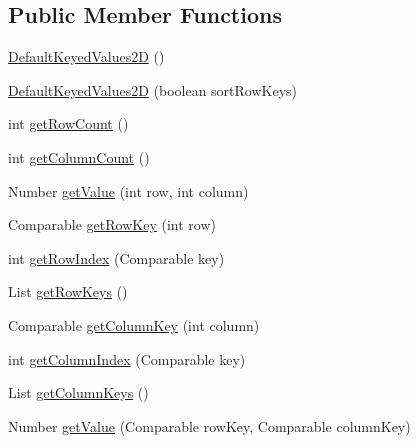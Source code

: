 \subsection*{Public Member Functions}
\begin{DoxyCompactItemize}
\item 
\mbox{\hyperlink{classorg_1_1jfree_1_1data_1_1_default_keyed_values2_d_ae59fdd8e8736823dd977172ee6c14449}{Default\+Keyed\+Values2D}} ()
\item 
\mbox{\hyperlink{classorg_1_1jfree_1_1data_1_1_default_keyed_values2_d_a13fb79f2ab8d086d9633fdd73f13ccb2}{Default\+Keyed\+Values2D}} (boolean sort\+Row\+Keys)
\item 
int \mbox{\hyperlink{classorg_1_1jfree_1_1data_1_1_default_keyed_values2_d_aaa4f83398caf1c5a2e59e719d72de13f}{get\+Row\+Count}} ()
\item 
int \mbox{\hyperlink{classorg_1_1jfree_1_1data_1_1_default_keyed_values2_d_add387af47bf3263842b9c06ef212bad2}{get\+Column\+Count}} ()
\item 
Number \mbox{\hyperlink{classorg_1_1jfree_1_1data_1_1_default_keyed_values2_d_a41bc5c5a2d789f49b7cf210a13f37a5a}{get\+Value}} (int row, int column)
\item 
Comparable \mbox{\hyperlink{classorg_1_1jfree_1_1data_1_1_default_keyed_values2_d_ada2ab1693bba62c0f8a8d5e046614b59}{get\+Row\+Key}} (int row)
\item 
int \mbox{\hyperlink{classorg_1_1jfree_1_1data_1_1_default_keyed_values2_d_aaca2e39352630d0f49c45a09b8a106e6}{get\+Row\+Index}} (Comparable key)
\item 
List \mbox{\hyperlink{classorg_1_1jfree_1_1data_1_1_default_keyed_values2_d_a5def878586be4fbe2c3bc7750eaac41b}{get\+Row\+Keys}} ()
\item 
Comparable \mbox{\hyperlink{classorg_1_1jfree_1_1data_1_1_default_keyed_values2_d_af2df339aaadf2c30c6fb2e331a69c39c}{get\+Column\+Key}} (int column)
\item 
int \mbox{\hyperlink{classorg_1_1jfree_1_1data_1_1_default_keyed_values2_d_a7850b37a7f84b089906f1713b6fef6f0}{get\+Column\+Index}} (Comparable key)
\item 
List \mbox{\hyperlink{classorg_1_1jfree_1_1data_1_1_default_keyed_values2_d_ae390bd83ecd242c0e90eee1d8adede7a}{get\+Column\+Keys}} ()
\item 
Number \mbox{\hyperlink{classorg_1_1jfree_1_1data_1_1_default_keyed_values2_d_a12490c45f6bd535f4cb0bbb5f6127567}{get\+Value}} (Comparable row\+Key, Comparable column\+Key)
\item 

\end{DoxyCompactItemize}

